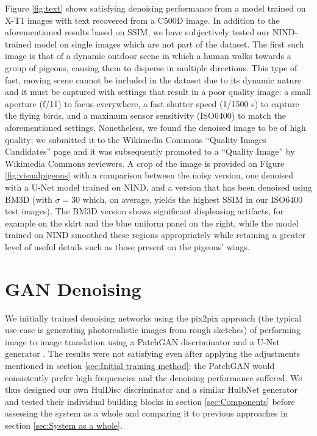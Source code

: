 Figure \ref{fig:text} shows satisfying denoising performance from a model trained on \ac{X-T1} images with text recovered from a \ac{C500D} image. In addition to the aforementioned results based on \ac{SSIM}, we have subjectively tested our \ac{NIND}-trained model on single images which are not part of the dataset. The first such image is that of a dynamic outdoor scene in which a human walks towards a group of pigeons, causing them to disperse in multiple directions. This type of fast, moving scene cannot be included in the dataset due to its dynamic nature and it must be captured with settings that result in a poor quality image: a small aperture (f/11) to focus everywhere, a fast shutter speed (1/1500 s) to capture the flying birds, and a maximum sensor sensitivity (ISO6400) to match the aforementioned settings. Nonetheless, we found the denoised image to be of high quality; we submitted it to the Wikimedia Commons ``Quality Images Candidates'' page \cite{qic} and it was subsequently promoted to a ``Quality Image'' by Wikimedia Commons reviewers. A crop of the image is provided on Figure \ref{fig:visualpigeons} with a comparison between the noisy version, one denoised with a U-Net model trained on \ac{NIND}, and a version that has been denoised using \ac{BM3D} (with $\sigma=30$ which, on average, yields the highest \ac{SSIM} in our ISO6400 test images). The \acs{BM3D} version shows significant displeasing artifacts, for example on the skirt and the blue uniform panel on the right, while the model trained on \ac{NIND} smoothed these regions appropriately while retaining a greater level of useful details such as those present on the pigeons' wings.


\section{GAN Denoising}\label{sec:GAN Denoising}

We initially trained denoising networks using the pix2pix approach (the typical use-case is generating photorealistic images from rough sketches) of performing image to image translation using a PatchGAN discriminator and a U-Net generator \cite{pix2pix}. The results were not satisfying even after applying the adjustments mentioned in section \ref{sec:Initial training method}; the PatchGAN would consistently prefer high frequencies and the denoising performance suffered. We thus designed our own HulDisc discriminator and a similar HulbNet generator and tested their individual building blocks in section \ref{sec:Components} before assessing the system as a whole and comparing it to previous approaches in section \ref{sec:System as a whole}.

